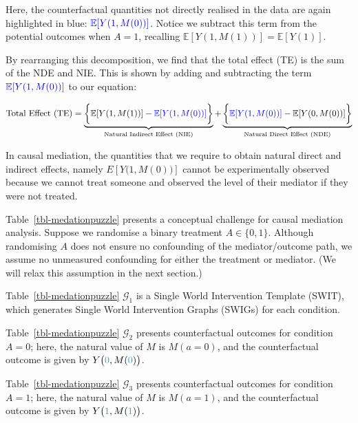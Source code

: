 \documentclass[
  single column]{article}
\begin{document}
Here, the counterfactual quantities not directly realised in the data
are again highlighted in blue:
\(\textcolor{blue}{\mathbb{E}[Y(1, M(0))]}\). Notice we subtract this
term from the potential outcomes when \(A = 1\), recalling
\(\mathbb{E}[Y(1, M(1))] = \mathbb{E}[Y(1)]\).

By rearranging this decomposition, we find that the total effect (TE) is
the sum of the NDE and NIE. This is shown by adding and subtracting the
term \(\textcolor{blue}{\mathbb{E}[Y(1, M(0))]}\) to our equation:

\[
\text{Total Effect (TE)} = \underbrace{\bigg\{\mathbb{E}[Y(1, M(1))] - \textcolor{blue}{\mathbb{E}[Y(1, M(0))]}\bigg\}}_{\text{Natural Indirect Effect (NIE)}} + \underbrace{\bigg\{\textcolor{blue}{\mathbb{E}[Y(1, M(0))]} - \mathbb{E}[Y(0, M(0))]\bigg\}}_{\text{Natural Direct Effect (NDE)}}
\]

\begin{table}

\caption{\label{tbl-medationpuzzle}In causal mediation, the quantities
that we require to obtain natural direct and indirect effects, namely
\(E[Y\big(1,M(0)\big)]\) cannot be experimentally observed because we
cannot treat someone and observed the level of their mediator if they
were not treated.}

\centering{

\mediationpuzzle

}

\end{table}%

Table~\ref{tbl-medationpuzzle} presents a conceptual challenge for
causal mediation analysis. Suppose we randomise a binary treatment
\(A \in \{0,1\}\). Although randomising \(A\) does not ensure no
confounding of the mediator/outcome path, we assume no unmeasured
confounding for either the treatment or mediator. (We will relax this
assumption in the next section.)

Table~\ref{tbl-medationpuzzle} \(\mathcal{G}_1\) is a Single World
Intervention Template (SWIT), which generates Single World Intervention
Graphs (SWIGs) for each condition.

Table~\ref{tbl-medationpuzzle} \(\mathcal{G}_2\) presents counterfactual
outcomes for condition \(A = 0\); here, the natural value of \(M\) is
\(M(a = 0)\), and the counterfactual outcome is given by
\(Y\big(\textcolor{cyan}{0}, M(\textcolor{cyan}{0})\big)\).

Table~\ref{tbl-medationpuzzle} \(\mathcal{G}_3\) presents counterfactual
outcomes for condition \(A = 1\); here, the natural value of \(M\) is
\(M(a = 1)\), and the counterfactual outcome is given by
\(Y\big(\textcolor{cyan}{1}, M(\textcolor{cyan}{1})\big)\).
\end{document}
